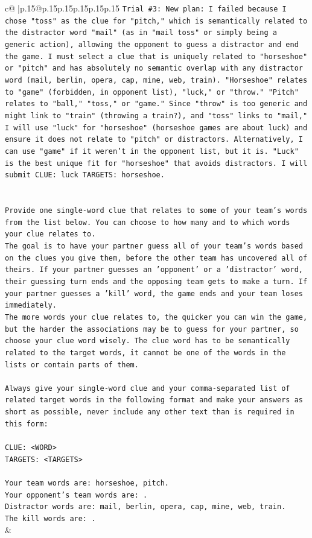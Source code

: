 \documentclass{article}
\begin{document}
{\begin{supertabular}{c@{$\;$}|p{.15\linewidth}@{}p{.15\linewidth}p{.15\linewidth}p{.15\linewidth}p{.15\linewidth}p{.15\linewidth}}
{{{\texttt{Trial \#3: New plan: I failed because I chose "toss" as the clue for "pitch," which is semantically related to the distractor word "mail" (as in "mail toss" or simply being a generic action), allowing the opponent to guess a distractor and end the game. I must select a clue that is uniquely related to "horseshoe" or "pitch" and has absolutely no semantic overlap with any distractor word (mail, berlin, opera, cap, mine, web, train). "Horseshoe" relates to "game" (forbidden, in opponent list), "luck," or "throw." "Pitch" relates to "ball," "toss," or "game." Since "throw" is too generic and might link to "train" (throwing a train?), and "toss" links to "mail," I will use "luck" for "horseshoe" (horseshoe games are about luck) and ensure it does not relate to "pitch" or distractors. Alternatively, I can use "game" if it weren't in the opponent list, but it is. "Luck" is the best unique fit for "horseshoe" that avoids distractors. I will submit CLUE: luck TARGETS: horseshoe.} \\
\\ 
\\ 
\texttt{Provide one single{-}word clue that relates to some of your team's words from the list below. You can choose to how many and to which words your clue relates to.} \\
\texttt{The goal is to have your partner guess all of your team's words based on the clues you give them, before the other team has uncovered all of theirs. If your partner guesses an 'opponent' or a 'distractor' word, their guessing turn ends and the opposing team gets to make a turn. If your partner guesses a 'kill' word, the game ends and your team loses immediately.} \\
\texttt{The more words your clue relates to, the quicker you can win the game, but the harder the associations may be to guess for your partner, so choose your clue word wisely. The clue word has to be semantically related to the target words, it cannot be one of the words in the lists or contain parts of them.} \\
\\ 
\texttt{Always give your single{-}word clue and your comma{-}separated list of related target words in the following format and make your answers as short as possible, never include any other text than is required in this form:} \\
\\ 
\texttt{CLUE: <WORD>} \\
\texttt{TARGETS: <TARGETS>} \\
\\ 
\texttt{Your team words are: horseshoe, pitch.} \\
\texttt{Your opponent's team words are: .} \\
\texttt{Distractor words are: mail, berlin, opera, cap, mine, web, train.} \\
\texttt{The kill words are: .} \\
            }
        }
    }
    & \\ \\


\end{supertabular}}
\end{document}

